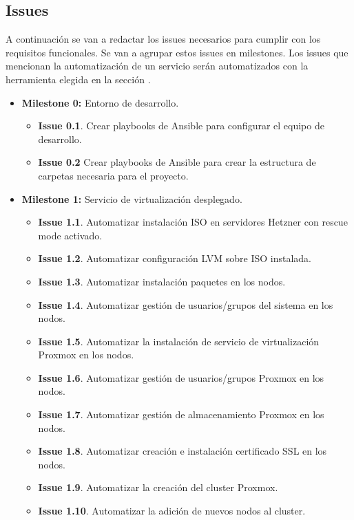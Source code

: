 \subsection{Issues}
\label{issues}
\begin{text}
	A continuación se van a redactar los issues necesarios para cumplir con los requisitos funcionales. Se van a agrupar estos issues en milestones. Los issues que mencionan la automatización de un servicio serán automatizados con la herramienta elegida en la sección .
	
	\begin{itemize}
		\item \textbf{Milestone 0:} Entorno de desarrollo. 
		\begin{itemize}
			\item \textbf{Issue 0.1}. Crear playbooks de Ansible para configurar el equipo de desarrollo.
			\item \textbf{Issue 0.2} Crear playbooks de Ansible para crear la estructura de carpetas necesaria para el proyecto.
		\end{itemize}
		\item \textbf{Milestone 1:} Servicio de virtualización desplegado. 
		\begin{itemize}
			\item \textbf{Issue 1.1}. Automatizar instalación ISO en servidores Hetzner con rescue mode activado.
			\item \textbf{Issue 1.2}. Automatizar configuración LVM sobre ISO instalada.
			\item \textbf{Issue 1.3}. Automatizar instalación paquetes en los nodos.
			\item \textbf{Issue 1.4}. Automatizar gestión de usuarios/grupos del sistema en los nodos.
			\item \textbf{Issue 1.5}. Automatizar la instalación de servicio de virtualización Proxmox en los nodos.
			\item \textbf{Issue 1.6}. Automatizar gestión de usuarios/grupos Proxmox en los nodos.
			\item \textbf{Issue 1.7}. Automatizar gestión de almacenamiento Proxmox en los nodos.
			\item \textbf{Issue 1.8}. Automatizar creación e instalación certificado SSL en los nodos.
			\item \textbf{Issue 1.9}. Automatizar la creación del cluster Proxmox.
			\item \textbf{Issue 1.10}. Automatizar la adición de nuevos nodos al cluster.

\end{itemize}
\end{itemize}
\end{text}
